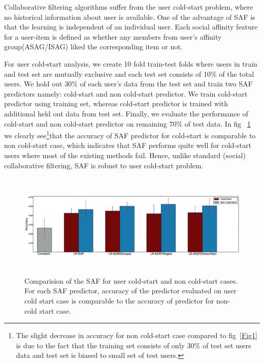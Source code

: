 Collaborative filtering algorithms suffer from the user cold-start problem,
where no historical information about user is available. One of the advantage of SAF is that 
the learning is independent of an individual user. Each social affinity feature for a user-item is
defined as whether any members from user's affinity group(ASAG/ISAG) liked the corresponding item or not. 

For user cold-start analysis, we create 10 fold train-test folds where users in train and test set are mutually exclusive
and each test set consists of 10\% of the total users. We hold out 30\% of each user's data from the test set 
and train two SAF predictors namely: cold-start and non cold-start predictor.
We train cold-start predictor using training set, whereas cold-start predictor is trained with additional 
held out data from test set. Finally, we evaluate the performance of cold-start and non cold-start predictor on remaining 70\% 
of test data. In fig ~\ref{fig:coldstart} we clearly see\footnote{ The slight decrease in accuracy for non cold-start case compared to 
fig~\ref{Fig1} is due to the fact that the training set consists of only 30\% of test set users data and test 
set is biased to small set of test users.}that the accuracy of  SAF predictor for cold-start is comparable
to non cold-start case, which indicates that SAF performs quite well for cold-start users where most of the
existing methods fail. Hence, unlike standard (social) collaborative filtering, SAF is robust to user 
cold-start problem.  


\begin{figure}[tbp!]
\centering
\includegraphics[width=180mm,height=50mm]{data/plots/new/cold_start.eps}
\vspace{-3mm}
\caption{Comparision of the SAF for user cold-start and non cold-start cases.
For each SAF predictor, accuracy of the predictor evaluated on user
cold start case is comparable to the accuracy of predictor for non-cold start case.}
\label{fig:coldstart}
\end{figure}
 

